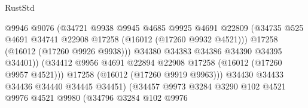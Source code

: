 \begin{lexlean}{RustStd}
\begin{coremodule}
                                            @9946
                                            @9076
                                            (@34721
                                              @9938
                                              @9945
                                              @4685
                                              @9925
                                              @4691
                                              @22809
                                              (@34735
                                                @525
                                                @4691
                                                @34741
                                                @22908
                                                @17258
                                                (@16012 (@17260 @9932 @4521)))
                                              @17258
                                              (@16012 (@17260 @9926 @9938)))
                                            @34380
                                            @34383
                                            @34386
                                            @34390
                                            @34395
                                            @34401))
                                        (@34412
                                          @9956
                                          @4691
                                          @22894
                                          @22908
                                          @17258
                                          (@16012 (@17260 @9957 @4521)))
                                        @17258
                                        (@16012 (@17260 @9919 @9963)))
                                      @34430
                                      @34433
                                      @34436
                                      @34440
                                      @34445
                                      @34451)
                                    (@34457
                                      @9973
                                      @3284
                                      @3290
                                      @102
                                      @4521
                                      @9976
                                      @4521
                                      @9980
                                      (@34796
                                        @3284
                                        @102
                                        @9976

\end{coremodule}
\end{lexlean}
